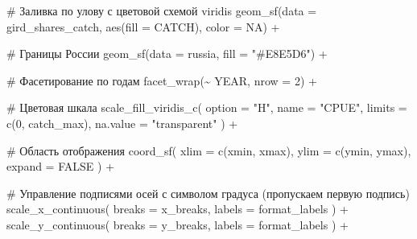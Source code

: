 \documentclass[
  letterpaper,
  DIV=11,
  numbers=noendperiod]{scrreprt}
\newenvironment{Shaded}{\begin{snugshade}}{\end{snugshade}}
\newcommand{\AttributeTok}[1]{\textcolor[rgb]{0.40,0.45,0.13}{#1}}
\newcommand{\CommentTok}[1]{\textcolor[rgb]{0.37,0.37,0.37}{#1}}
\newcommand{\ConstantTok}[1]{\textcolor[rgb]{0.56,0.35,0.01}{#1}}
\newcommand{\DecValTok}[1]{\textcolor[rgb]{0.68,0.00,0.00}{#1}}
\newcommand{\FunctionTok}[1]{\textcolor[rgb]{0.28,0.35,0.67}{#1}}
\newcommand{\NormalTok}[1]{\textcolor[rgb]{0.00,0.23,0.31}{#1}}
\newcommand{\SpecialCharTok}[1]{\textcolor[rgb]{0.37,0.37,0.37}{#1}}
\newcommand{\StringTok}[1]{\textcolor[rgb]{0.13,0.47,0.30}{#1}}
\begin{document}
\begin{Shaded}
\begin{Highlighting}[]
  \CommentTok{\# Заливка по улову с цветовой схемой viridis}
  \FunctionTok{geom\_sf}\NormalTok{(}\AttributeTok{data =}\NormalTok{ gird\_shares\_catch, }\FunctionTok{aes}\NormalTok{(}\AttributeTok{fill =}\NormalTok{ CATCH), }\AttributeTok{color =} \ConstantTok{NA}\NormalTok{) }\SpecialCharTok{+}
  
  \CommentTok{\# Границы России}
  \FunctionTok{geom\_sf}\NormalTok{(}\AttributeTok{data =}\NormalTok{ russia, }\AttributeTok{fill =} \StringTok{"\#E8E5D6"}\NormalTok{) }\SpecialCharTok{+}
  
  \CommentTok{\# Фасетирование по годам}
  \FunctionTok{facet\_wrap}\NormalTok{(}\SpecialCharTok{\textasciitilde{}}\NormalTok{ YEAR, }\AttributeTok{nrow =} \DecValTok{2}\NormalTok{) }\SpecialCharTok{+}
  
  \CommentTok{\# Цветовая шкала}
  \FunctionTok{scale\_fill\_viridis\_c}\NormalTok{(}
    \AttributeTok{option =} \StringTok{"H"}\NormalTok{, }
    \AttributeTok{name =} \StringTok{"CPUE"}\NormalTok{,}
    \AttributeTok{limits =} \FunctionTok{c}\NormalTok{(}\DecValTok{0}\NormalTok{, catch\_max),}
    \AttributeTok{na.value =} \StringTok{"transparent"}
\NormalTok{  ) }\SpecialCharTok{+}
  
  \CommentTok{\# Область отображения}
  \FunctionTok{coord\_sf}\NormalTok{(}
    \AttributeTok{xlim =} \FunctionTok{c}\NormalTok{(xmin, xmax), }
    \AttributeTok{ylim =} \FunctionTok{c}\NormalTok{(ymin, ymax),}
    \AttributeTok{expand =} \ConstantTok{FALSE}
\NormalTok{  ) }\SpecialCharTok{+}
  
  \CommentTok{\# Управление подписями осей с символом градуса (пропускаем первую подпись)}
  \FunctionTok{scale\_x\_continuous}\NormalTok{(}
    \AttributeTok{breaks =}\NormalTok{ x\_breaks,}
    \AttributeTok{labels =}\NormalTok{ format\_labels}
\NormalTok{  ) }\SpecialCharTok{+}
  \FunctionTok{scale\_y\_continuous}\NormalTok{(}
    \AttributeTok{breaks =}\NormalTok{ y\_breaks,}
    \AttributeTok{labels =}\NormalTok{ format\_labels}
\NormalTok{  ) }\SpecialCharTok{+}
  

\end{Highlighting}
\end{Shaded}
\end{document}
